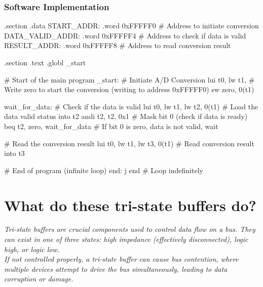 \subsubsection{Software Implementation}
\begin{center}
\begin{assembly}
.section .data
START_ADDR:      .word 0xFFFFF0     # Address to initiate conversion
DATA_VALID_ADDR: .word 0xFFFFF4     # Address to check if data is valid
RESULT_ADDR:     .word 0xFFFFF8     # Address to read conversion result

.section .text
.globl _start

# Start of the main program
_start:
    # Initiate A/D Conversion
    lui t0, %
    lw t1, %
    # Write zero to start the conversion (writing to address 0xFFFFF0)
    sw zero, 0(t1)               

wait_for_data:
    # Check if the data is valid
    lui t0, %
    lw t1, %
    lw t2, 0(t1)                  # Load the data valid status into t2
    andi t2, t2, 0x1              # Mask bit 0 (check if data is ready)
    beq t2, zero, wait_for_data   # If bit 0 is zero, data is not valid, wait

    # Read the conversion result
    lui t0, %
    lw t1, %
    lw t3, 0(t1)                  # Read conversion result into t3

    # End of program (infinite loop)
end:
    j end                         # Loop indefinitely        
\end{assembly}
\end{center}
\newpage 
\section{What do these tri-state buffers do?}
\textit{Tri-state buffers are crucial components used to control data flow on a bus. They can exist in one of three states: high impedance (effectively disconnected), logic high, or logic low.}
\\
\textit{If not controlled properly, a tri-state buffer can cause bus contention, where multiple devices attempt to drive the bus simultaneously, leading to data corruption or damage.}

